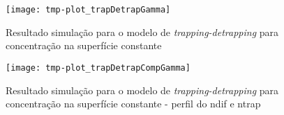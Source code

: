 \begin{figure}[ht]
\centering
	\caption{Resultado simulação para o modelo de \textit{trapping-detrapping} para concentração na superfície constante }
	\texttt{[image: tmp-plot\_trapDetrapGamma]}
	\label{fig:csvar-gas}
	\centering
\end{figure}


\begin{figure}[ht]
\centering
	\caption{Resultado simulação para o modelo de \textit{trapping-detrapping} para concentração na superfície constante - perfil do ndif e ntrap }
	\texttt{[image: tmp-plot\_trapDetrapCompGamma]}
	\label{fig:csvar-gas}
	\centering
\end{figure}